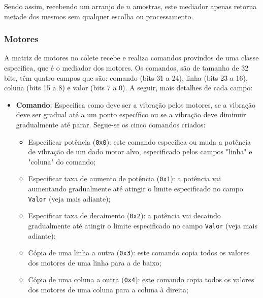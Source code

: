 \documentclass{sig-alternate-05-2015}
\begin{document}
            Sendo assim, recebendo um arranjo de $n$ amostras, este mediador
            apenas retorna metade dos mesmos sem qualquer escolha ou
            processamento.

        \subsubsection{Motores}
            A matriz de motores no colete recebe e realiza comandos provindos
            de uma classe específica, que é o mediador dos motores. Os
            comandos, são de tamanho de 32 bits, têm quatro campos que são:
            comando (bits 31 a 24), linha (bits 23 a 16), coluna (bits 15 a 8)
            e valor (bits 7 a 0). A seguir, mais detalhes de cada campo:
            \begin{itemize}
                \item \textbf{Comando}: Especifica como deve ser a vibração
                    pelos motores, se a vibração deve ser gradual até a um
                    ponto específico ou se a vibração deve diminuir
                    gradualmente até parar. Segue-se os cinco comandos criados:
                \begin{itemize}
                    \item Especificar potência (\texttt{0x0}): este comando
                        especifica ou muda a potência de vibração de um dado
                        motor alvo, especificado pelos campos "linha" e
                        "coluna" do comando;
                    \item Especificar taxa de aumento de potência
                        (\texttt{0x1}): a potência vai aumentando gradualmente
                        até atingir o limite especificado no campo
                        \texttt{Valor} (veja mais adiante);
                    \item Especificar taxa de decaimento (\texttt{0x2}): a
                        potência vai decaindo gradualmente até atingir o limite
                        especificado no campo \texttt{Valor} (veja mais
                        adiante);
                    \item Cópia de uma linha a outra (\texttt{0x3}): este
                        comando copia todos os valores dos motores de uma linha
                        para a de baixo;
                    \item Cópia de uma coluna a outra (\texttt{0x4}): este
                        comando copia todos os valores dos motores de uma
                        coluna para a coluna à direita;
                \end{itemize}
                

\end{itemize}
\end{document}
